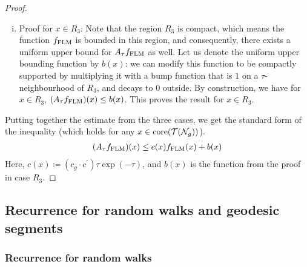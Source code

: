 \begin{proof}
\begin{enumerate}[(i)]
    Furthermore, since $z_{i, \mathrm{im}}$ is constant along balls in $\mathbb{H}_j$ for $j \neq i$, it suffices to average just each term of the sum in the corresponding $\mathbb{H}_i$.
    We do so, using the same estimate from the proof in the $R_1$ case.
    \begin{align*}
      (A_{\tau}\flm^{\prime})(x) \leq c^{\prime} \tau \exp(-\tau) \flm^{\prime}(x)
    \end{align*}
    Replacing $\flm^{\prime}$ with $\flm$ gives us the inequality we want, and proves the result in this case.
    \begin{align*}
      (A_{\tau}\flm)(x) \leq  (c_g \cdot c^{\prime}) \tau \exp(-\tau) \flm(x)
    \end{align*}
  \item Proof for $x \in R_3$: Note that the region $R_3$ is compact, which means the function $\flm$ is bounded in this region, and consequently, there exists a uniform upper bound for $A_\tau f_{\mathrm{FLM}}$ as well.
    Let us denote the uniform upper bounding function by $b(x)$: we can modify this function to be compactly supported by multiplying it with a bump function that is $1$ on a $\tau$-neighbourhood of $R_3$, and decays to $0$ outside.
    By construction, we have for $x \in R_3$, $(A_{\tau}f_{\mathrm{FLM}})(x) \leq b(x)$.
    This proves the result for $x \in R_3$.
  \end{enumerate}
  Putting together the estimate from the three cases, we get the standard form of the inequality (which holds for any $x \in \mathrm{core}(\mathcal{T}(\mathcal{N}_g))$).
  \begin{align*}
    (A_{\tau} f_{\mathrm{FLM}})(x) \leq c(x) f_{\mathrm{FLM}}(x) + b(x)
  \end{align*}
  Here, $c(x) \coloneqq (c_g \cdot c^{\prime}) \tau \exp(-\tau)$, and $b(x)$ is the function from the proof in case $R_3$.
\end{proof}

\subsection{Recurrence for random walks and geodesic segments}
\label{sec:recurr-rand-walks-1}


\subsubsection{Recurrence for random walks}
\label{sec:recurr-rand-walks-2}

